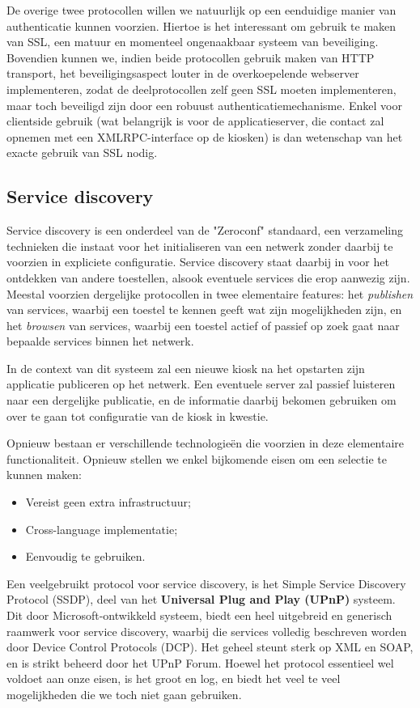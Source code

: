 De overige twee protocollen willen we natuurlijk op een eenduidige manier van authenticatie kunnen voorzien. Hiertoe is het interessant om gebruik te maken van SSL, een matuur en momenteel ongenaakbaar systeem van beveiliging. Bovendien kunnen we, indien beide protocollen gebruik maken van HTTP transport, het beveiligingsaspect louter in de overkoepelende webserver implementeren, zodat de deelprotocollen zelf geen SSL moeten implementeren, maar toch beveiligd zijn door een robuust authenticatiemechanisme. Enkel voor clientside gebruik (wat belangrijk is voor de applicatieserver, die contact zal opnemen met een XMLRPC-interface op de kiosken) is dan wetenschap van het exacte gebruik van SSL nodig.

\subsection{Service discovery}

Service discovery is een onderdeel van de "Zeroconf" standaard, een verzameling technieken die instaat voor het initialiseren van een netwerk zonder daarbij te voorzien in expliciete configuratie. Service discovery staat daarbij in voor het ontdekken van andere toestellen, alsook eventuele services die erop aanwezig zijn. Meestal voorzien dergelijke protocollen in twee elementaire features: het \emph{publishen} van services, waarbij een toestel te kennen geeft wat zijn mogelijkheden zijn, en het \emph{browsen} van services, waarbij een toestel actief of passief op zoek gaat naar bepaalde services binnen het netwerk.

In de context van dit systeem zal een nieuwe kiosk na het opstarten zijn applicatie publiceren op het netwerk. Een eventuele server zal passief luisteren naar een dergelijke publicatie, en de informatie daarbij bekomen gebruiken om over te gaan tot configuratie van de kiosk in kwestie.

Opnieuw bestaan er verschillende technologieën die voorzien in deze elementaire functionaliteit. Opnieuw stellen we enkel bijkomende eisen om een selectie te kunnen maken:
\begin{itemize}
\item Vereist geen extra infrastructuur;
\item Cross-language implementatie;
\item Eenvoudig te gebruiken.
\end{itemize}

Een veelgebruikt protocol voor service discovery, is het Simple Service Discovery Protocol (SSDP), deel van het \textbf{Universal Plug and Play (UPnP)} systeem. Dit door Microsoft-ontwikkeld systeem, biedt een heel uitgebreid en generisch raamwerk voor service discovery, waarbij die services volledig beschreven worden door Device Control Protocols (DCP). Het geheel steunt sterk op XML en SOAP, en is strikt beheerd door het UPnP Forum. Hoewel het protocol essentieel wel voldoet aan onze eisen, is het groot en log, en biedt het veel te veel mogelijkheden die we toch niet gaan gebruiken.

